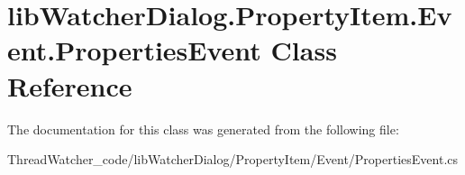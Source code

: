 \hypertarget{classlib_watcher_dialog_1_1_property_item_1_1_event_1_1_properties_event}{\section{lib\+Watcher\+Dialog.\+Property\+Item.\+Event.\+Properties\+Event Class Reference}
\label{classlib_watcher_dialog_1_1_property_item_1_1_event_1_1_properties_event}
}


The documentation for this class was generated from the following file\+:\begin{DoxyCompactItemize}
\item 
Thread\+Watcher\+\_\+code/lib\+Watcher\+Dialog/\+Property\+Item/\+Event/Properties\+Event.\+cs\end{DoxyCompactItemize}
